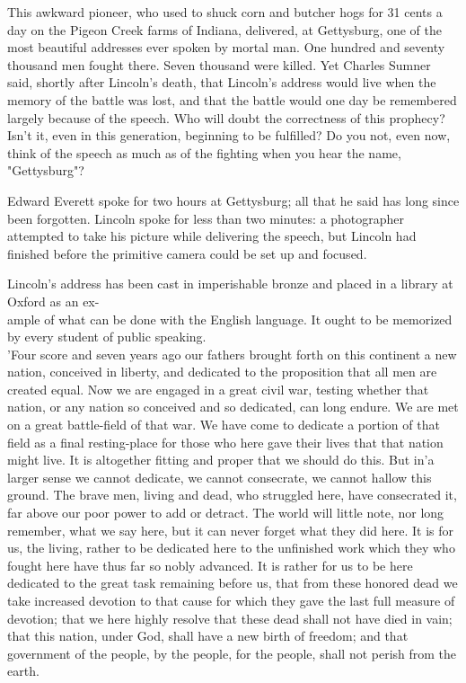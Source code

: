 \documentclass[10pt]{article}
\begin{document}
This awkward pioneer, who used to shuck corn and butcher hogs for 31 cents a day on the Pigeon Creek farms of Indiana, delivered, at Gettysburg, one of the most beautiful addresses ever spoken by mortal man. One hundred and seventy thousand men fought there. Seven thousand were killed. Yet Charles Sumner said, shortly after Lincoln's death, that Lincoln's address would live when the memory of the battle was lost, and that the battle would one day be remembered largely because of the speech. Who will doubt the correctness of this prophecy? Isn't it, even in this generation, beginning to be fulfilled? Do you not, even now, think of the speech as much as of the fighting when you hear the name, "Gettysburg"?

Edward Everett spoke for two hours at Gettysburg; all that he said has long since been forgotten. Lincoln spoke for less than two minutes: a photographer attempted to take his picture while delivering the speech, but Lincoln had finished before the primitive camera could be set up and focused.

Lincoln's address has been cast in imperishable bronze and placed in a library at Oxford as an ex-\\
ample of what can be done with the English language. It ought to be memorized by every student of public speaking.\\
'Four score and seven years ago our fathers brought forth on this continent a new nation, conceived in liberty, and dedicated to the proposition that all men are created equal. Now we are engaged in a great civil war, testing whether that nation, or any nation so conceived and so dedicated, can long endure. We are met on a great battle-field of that war. We have come to dedicate a portion of that field as a final resting-place for those who here gave their lives that that nation might live. It is altogether fitting and proper that we should do this. But in'a larger sense we cannot dedicate, we cannot consecrate, we cannot hallow this ground. The brave men, living and dead, who struggled here, have consecrated it, far above our poor power to add or detract. The world will little note, nor long remember, what we say here, but it can never forget what they did here. It is for us, the living, rather to be dedicated here to the unfinished work which they who fought here have thus far so nobly advanced. It is rather for us to be here dedicated to the great task remaining before us, that from these honored dead we take increased devotion to that cause for which they gave the last full measure of devotion; that we here highly resolve that these dead shall not have died in vain; that this nation, under God, shall have a new birth of freedom; and that government of the people, by the people, for the people, shall not perish from the earth.
\end{document}
